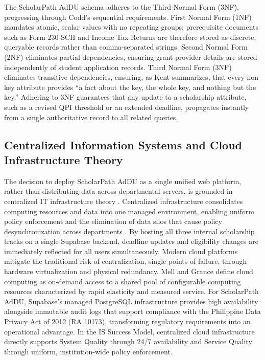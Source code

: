 The ScholarPath AdDU schema adheres to the Third Normal Form (3NF), progressing through Codd's sequential requirements. First Normal Form (1NF) mandates atomic, scalar values with no repeating groups; prerequisite documents such as Form 230-SCH and Income Tax Returns are therefore stored as discrete, queryable records rather than comma-separated strings. Second Normal Form (2NF) eliminates partial dependencies, ensuring grant provider details are stored independently of student application records. Third Normal Form (3NF) eliminates transitive dependencies, ensuring, as Kent \cite{ref32} summarizes, that every non-key attribute provides ``a fact about the key, the whole key, and nothing but the key.'' Adhering to 3NF guarantees that any update to a scholarship attribute, such as a revised QPI threshold or an extended deadline, propagates instantly from a single authoritative record to all related queries.

\subsection{Centralized Information Systems and Cloud Infrastructure Theory}

The decision to deploy ScholarPath AdDU as a single unified web platform, rather than distributing data across departmental servers, is grounded in centralized IT infrastructure theory \cite{ref34}. Centralized infrastructure consolidates computing resources and data into one managed environment, enabling uniform policy enforcement and the elimination of data silos that cause policy desynchronization across departments \cite{ref41}. By hosting all three internal scholarship tracks on a single Supabase backend, deadline updates and eligibility changes are immediately reflected for all users simultaneously. Modern cloud platforms mitigate the traditional risk of centralization, single points of failure, through hardware virtualization and physical redundancy. Mell and Grance \cite{ref34} define cloud computing as on-demand access to a shared pool of configurable computing resources characterized by rapid elasticity and measured service. For ScholarPath AdDU, Supabase's managed PostgreSQL infrastructure provides high availability alongside immutable audit logs that support compliance with the Philippine Data Privacy Act of 2012 (RA 10173), transforming regulatory requirements into an operational advantage. In the IS Success Model, centralized cloud infrastructure directly supports System Quality through 24/7 availability and Service Quality through uniform, institution-wide policy enforcement.

